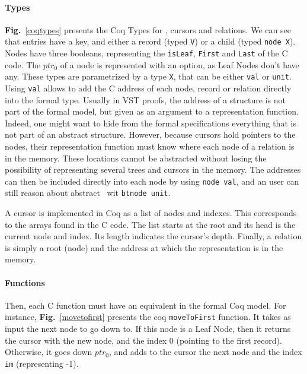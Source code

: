 \paragraph{Types}\textbf{Fig.}~\ref{coqtypes} presents the Coq Types for \btrees, cursors and relations. 
We can see that entries have a key, and either a record (typed \texttt{V}) or a child (typed \texttt{node X}).
Nodes have three booleans, representing the \texttt{isLeaf}, \texttt{First} and \texttt{Last} of the C code.
The $ptr_0$ of a node is represented with an option, as Leaf Nodes don't have any.
These types are parametrized by a type \texttt{X}, that can be either \texttt{val} or \texttt{unit}.
Using \texttt{val} allows to add the C address of each node, record or relation directly into the formal type.
Usually in VST proofs, the address of a structure is not part of the formal model, but given as an argument to a representation function.
Indeed, one might want to hide from the formal specifications everything that is not part of an abstract structure.
However, because cursors hold pointers to the nodes, their representation function must know where each node of a relation is in the memory.
These locations cannot be abstracted without losing the possibility of representing several trees and cursors in the memory.
The addresses can then be included directly into each node by using \texttt{node val}, and an user can still reason about abstract \btrees\ wit \texttt{btnode unit}.

A cursor is implemented in Coq as a list of nodes and indexes.
This corresponds to the arrays found in the C code. The list starts at the root and its head is the current node and index.
Its length indicates the cursor's depth.
Finally, a relation is simply a root (node) and the address at which the representation is in the memory.%

\paragraph{Functions} Then, each C function must have an equivalent in the formal Coq model.
For instance, \textbf{Fig.}~\ref{movetofirst} presents the coq \texttt{moveToFirst} function.
It takes as input the next node to go down to. If this node is a Leaf Node, then it returns the cursor with the new node, and the index 0 (pointing to the first record).
Otherwise, it goes down $ptr_0$, and adds to the cursor the next node and the index \texttt{im} (representing -1).


